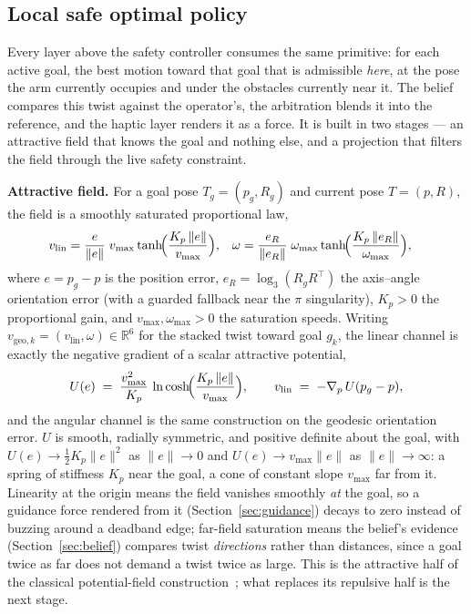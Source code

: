 \documentclass[12pt,a4paper,twoside,openright]{report}
\begin{document}
\subsection{Local safe optimal policy}
\label{sec:localpolicy}

Every layer above the safety controller consumes the same primitive: for each active goal, the best motion toward that goal that is admissible \emph{here}, at the pose the arm currently occupies and under the obstacles currently near it. The belief compares this twist against the operator's, the arbitration blends it into the reference, and the haptic layer renders it as a force. It is built in two stages --- an attractive field that knows the goal and nothing else, and a projection that filters the field through the live safety constraint.

\textbf{Attractive field.} For a goal pose $T_g = (p_g, R_g)$ and current pose $T = (p, R)$, the field is a smoothly saturated proportional law,
\begin{align}
v_{\text{lin}} &= \frac{e}{\|e\|}\; v_{\max}\tanh\!\Bigl(\frac{K_p\,\|e\|}{v_{\max}}\Bigr),
&
\omega &= \frac{e_R}{\|e_R\|}\; \omega_{\max}\tanh\!\Bigl(\frac{K_p\,\|e_R\|}{\omega_{\max}}\Bigr),
\label{eq:vgeo}
\end{align}
where $e = p_g - p$ is the position error, $e_R = \log_3(R_g R^{\top})$ the axis--angle orientation error (with a guarded fallback near the $\pi$ singularity), $K_p > 0$ the proportional gain, and $v_{\max}, \omega_{\max} > 0$ the saturation speeds. Writing $v_{\text{geo},k} = (v_{\text{lin}}, \omega) \in \mathbb{R}^6$ for the stacked twist toward goal $g_k$, the linear channel is exactly the negative gradient of a scalar attractive potential,
\begin{equation}
U(e) \;=\; \frac{v_{\max}^{2}}{K_p}\,\ln\cosh\!\Bigl(\frac{K_p\,\|e\|}{v_{\max}}\Bigr),
\qquad
v_{\text{lin}} \;=\; -\nabla_{p}\,U(p_g - p),
\label{eq:attpot}
\end{equation}
and the angular channel is the same construction on the geodesic orientation error. $U$ is smooth, radially symmetric, and positive definite about the goal, with $U(e) \to \tfrac{1}{2}K_p\|e\|^{2}$ as $\|e\| \to 0$ and $U(e) \to v_{\max}\|e\|$ as $\|e\| \to \infty$: a spring of stiffness $K_p$ near the goal, a cone of constant slope $v_{\max}$ far from it. Linearity at the origin means the field vanishes smoothly \emph{at} the goal, so a guidance force rendered from it (Section~\ref{sec:guidance}) decays to zero instead of buzzing around a deadband edge; far-field saturation means the belief's evidence (Section~\ref{sec:belief}) compares twist \emph{directions} rather than distances, since a goal twice as far does not demand a twist twice as large. This is the attractive half of the classical potential-field construction~\cite{khatib1986}; what replaces its repulsive half is the next stage.
\end{document}
